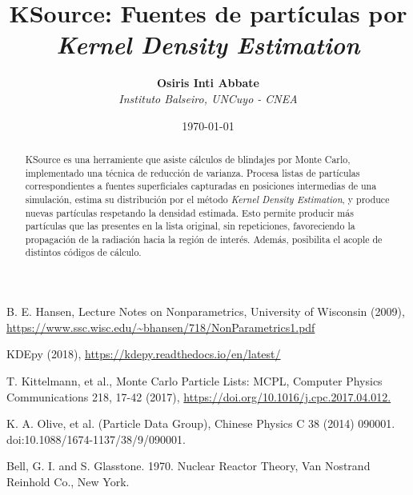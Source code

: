 \documentclass[11pt]{article}
\title{\textbf{KSource: Fuentes de partículas por \emph{Kernel Density Estimation}} \vspace{4mm} }
\author{
    \textbf{Osiris Inti Abbate} \vspace{2mm} \\
    \textit{Instituto Balseiro, UNCuyo - CNEA}
}
\date{\today}
\begin{document}
\maketitle

\begin{abstract}

KSource es una herramiente que asiste cálculos de blindajes por Monte Carlo, implementado una técnica de reducción de varianza. Procesa listas de partículas correspondientes a fuentes superficiales capturadas en posiciones intermedias de una simulación, estima su distribución por el método \emph{Kernel Density Estimation}, y produce nuevas partículas respetando la densidad estimada. Esto permite producir más partículas que las presentes en la lista original, sin repeticiones, favoreciendo la propagación de la radiación hacia la región de interés. Además, posibilita el acople de distintos códigos de cálculo.

\end{abstract}





\begin{appendices}
    
\end{appendices}

\begin{thebibliography}{9}

     B. E. Hansen, Lecture Notes on Nonparametrics, University of Wisconsin (2009), \url{https://www.ssc.wisc.edu/~bhansen/718/NonParametrics1.pdf}

     KDEpy (2018), \url{https://kdepy.readthedocs.io/en/latest/}

     T. Kittelmann, et al., Monte Carlo Particle Lists: MCPL, Computer Physics Communications 218, 17-42 (2017), \url{https://doi.org/10.1016/j.cpc.2017.04.012.}

     K. A. Olive, et al. (Particle Data Group), Chinese Physics C 38 (2014) 090001. doi:10.1088/1674-1137/38/9/090001.

     Bell, G. I. and S. Glasstone. 1970. Nuclear Reactor Theory, Van Nostrand Reinhold Co., New York.


\end{thebibliography}
\end{document}
